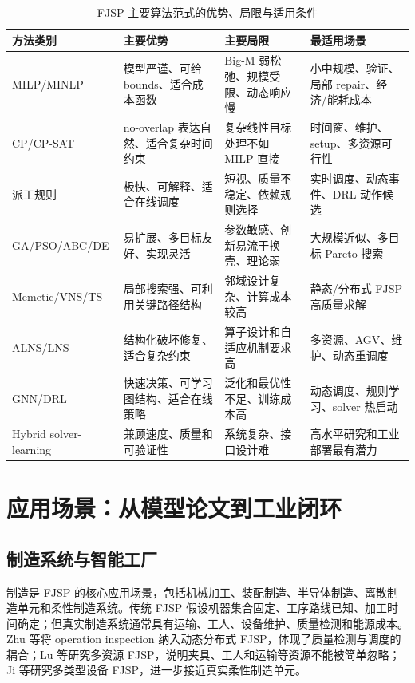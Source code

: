 \documentclass[UTF8,a4paper,11pt]{ctexart}
\begin{document}
\begin{table}[H]
\centering
\caption{FJSP 主要算法范式的优势、局限与适用条件}
\label{tab:method_compare}
\begin{tabularx}{\textwidth}{p{2.6cm}Y Y Y}
\toprule
方法类别 & 主要优势 & 主要局限 & 最适用场景 \\
\midrule
MILP/MINLP & 模型严谨、可给 bounds、适合成本函数 & Big-M 弱松弛、规模受限、动态响应慢 & 小中规模、验证、局部 repair、经济/能耗成本 \\
CP/CP-SAT & no-overlap 表达自然、适合复杂时间约束 & 复杂线性目标处理不如 MILP 直接 & 时间窗、维护、setup、多资源可行性 \\
派工规则 & 极快、可解释、适合在线调度 & 短视、质量不稳定、依赖规则选择 & 实时调度、动态事件、DRL 动作候选 \\
GA/PSO/ABC/DE & 易扩展、多目标友好、实现灵活 & 参数敏感、创新易流于换壳、理论弱 & 大规模近似、多目标 Pareto 搜索 \\
Memetic/VNS/TS & 局部搜索强、可利用关键路径结构 & 邻域设计复杂、计算成本较高 & 静态/分布式 FJSP 高质量求解 \\
ALNS/LNS & 结构化破坏修复、适合复杂约束 & 算子设计和自适应机制要求高 & 多资源、AGV、维护、动态重调度 \\
GNN/DRL & 快速决策、可学习图结构、适合在线策略 & 泛化和最优性不足、训练成本高 & 动态调度、规则学习、solver 热启动 \\
Hybrid solver-learning & 兼顾速度、质量和可验证性 & 系统复杂、接口设计难 & 高水平研究和工业部署最有潜力 \\
\bottomrule
\end{tabularx}
\end{table}

\section{应用场景：从模型论文到工业闭环}

\subsection{制造系统与智能工厂}

制造是 FJSP 的核心应用场景，包括机械加工、装配制造、半导体制造、离散制造单元和柔性制造系统。传统 FJSP 假设机器集合固定、工序路线已知、加工时间确定；但真实制造系统通常具有运输、工人、设备维护、质量检测和能源成本。Zhu 等将 operation inspection 纳入动态分布式 FJSP，体现了质量检测与调度的耦合\cite{Zhu2023Inspection}；Lu 等研究多资源 FJSP，说明夹具、工人和运输等资源不能被简单忽略\cite{Lu2024MultiResource}；Ji 等研究多类型设备 FJSP，进一步接近真实柔性制造单元\cite{Ji2025MultiType}。
\end{document}
